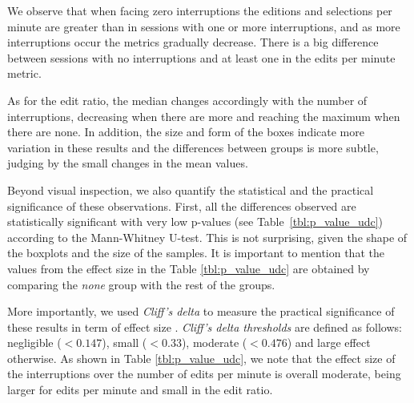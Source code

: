 We observe that when facing zero interruptions the editions and selections per minute are greater than in sessions with one or more interruptions, and as more interruptions occur the metrics gradually decrease. There is a big difference between sessions with no interruptions and at least one in the edits per minute metric.

As for the edit ratio, the median changes accordingly with the number of interruptions, decreasing when there are more and reaching the maximum when there are none. In addition, the size and form of the boxes indicate more variation in these results and the differences between groups is more subtle, judging by the small changes in the mean values.

Beyond visual inspection, we also quantify the statistical and the practical significance of these observations. First, all the differences observed are statistically significant with very low p-values (see Table~\ref{tbl:p_value_udc}) according to the Mann-Whitney U-test. This is not surprising, given the shape of the boxplots and the size of the samples. It is important to mention that the values from the effect size in the Table \ref{tbl:p_value_udc} are obtained by comparing the \textit{none} group with the rest of the groups.


More importantly, we used \textit{Cliff's delta} to measure the practical significance of these results in term of effect size %
\cite{C94}. \textit{Cliff's delta thresholds} are defined as follows: negligible ($<0.147$), small  ($<0.33$), moderate ($<0.476$) and large effect otherwise. As shown in Table \ref{tbl:p_value_udc}, we note that the effect size of the interruptions over the number of edits per minute is overall moderate, being larger for edits per minute and small in the edit ratio. %

